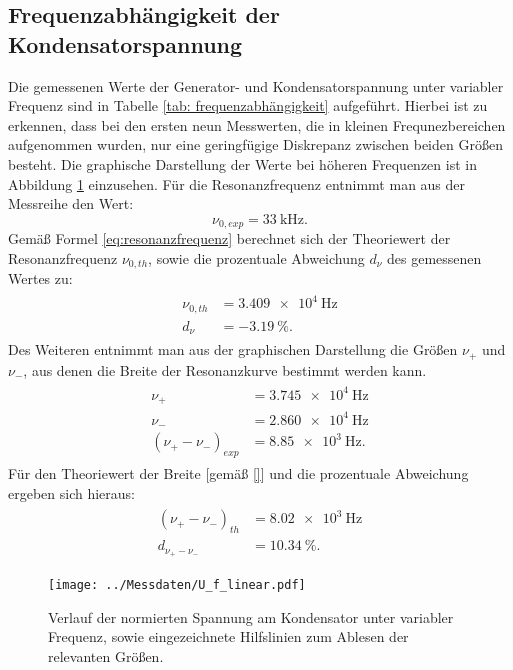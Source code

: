 \subsection{Frequenzabhängigkeit der Kondensatorspannung}
Die gemessenen Werte der Generator- und Kondensatorspannung unter variabler Frequenz sind in Tabelle \ref{tab: frequenzabhängigkeit} aufgeführt.
Hierbei ist zu erkennen, dass bei den ersten neun Messwerten, die in kleinen Frequnezbereichen aufgenommen wurden, nur eine geringfügige
Diskrepanz zwischen beiden Größen besteht. Die graphische Darstellung der Werte bei höheren Frequenzen ist in Abbildung \ref{fig: spannungsverlauf_U_C}
einzusehen. Für die Resonanzfrequenz entnimmt man aus der Messreihe den Wert:
\begin{equation}
  \nu_{0, exp} = \SI{33}{\kilo\hertz}.
  \label{eq: exp_resonanzfrequenz}
\end{equation}
Gemäß Formel \eqref{eq:resonanzfrequenz} berechnet sich der Theoriewert der Resonanzfrequenz $\nu_{0, th}$, sowie die prozentuale Abweichung $d_{\nu}$ des gemessenen Wertes zu:
\begin{align}
  \begin{aligned}
  \nu_{0, th} &= \SI{3.409e4}{\hertz} \\
  d_{\nu} &= \SI{-3.19}{\percent}.
\end{aligned}
\label{eq: theo_resonanzfrequenz}
\end{align}
Des Weiteren entnimmt man aus der graphischen Darstellung die Größen $\nu_+$ und $\nu_-$, aus denen die Breite der Resonanzkurve bestimmt werden kann.
\begin{align}
  \begin{aligned}
  \nu_{+} &= \SI{3.745e4}{\hertz} \\
  \nu_{-} &= \SI{2.860e4}{\hertz} \\
  (\nu_{+}-\nu_{-})_{exp} &= \SI{8.85e3}{\hertz}.
\end{aligned}
\label{eq: breite_exp}
\end{align}
Für den Theoriewert der Breite [gemäß \eqref{}] und die prozentuale Abweichung ergeben sich hieraus:
\begin{align}
  \begin{aligned}
  (\nu_{+}-\nu_{-})_{th} &= \SI{8.02e3}{\hertz}\\
  d_{\nu_{+}-\nu_{-}} &= \SI{10.34}{\percent}.
\end{aligned}
\label{eq: theo_breite}
\end{align}
\begin{figure}
  \centering
  \texttt{[image: ../Messdaten/U\_f\_linear.pdf]}
  \caption{Verlauf der normierten Spannung am Kondensator unter variabler Frequenz, sowie eingezeichnete Hilfslinien zum Ablesen der relevanten Größen.}
  \label{fig: spannungsverlauf_U_C}
\end{figure}
